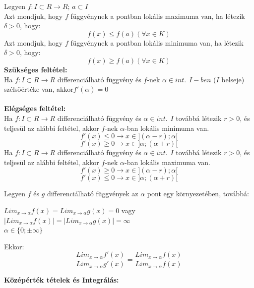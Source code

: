 \documentclass[12pt,a4paper]{article}
\begin{document}
\begin{tcolorbox}[colback=green!5!white,colframe=green!60!black,title= 6. Lokális szélsőérték definíciója és feltétele]
Legyen \(f : I \subset  R \to R\); \(a\subset  I\)\\
    Azt mondjuk, hogy \(f\) függvénynek a pontban lokális maximuma van, ha létezik \(\delta > 0\), hogy:
    $$f(x) \leq  f(a) (\forall  x \in K)$$
    Azt mondjuk, hogy \(f\) függvénynek a pontban lokális minimuma van, ha létezik \(\delta > 0\), hogy:
    $$f(x) \geq  f(a) (\forall  x \in K)$$
    \textbf{Szükséges feltétel:}\\
    Ha \(f : I \subset  R \to R\) differenciálható függvény és \(f\)-nek  \(\alpha \in int.\hspace{5pt}I-ben\) (\(I\) belseje) szélsőértéke van, akkor\(f'(\alpha)=0\)\\\\
    \textbf{Elégséges feltétel:}\\
    Ha \(f : I \subset  R \to R\) differenciálható függvény és \(\alpha \in int. \hspace{5pt}I\) továbbá létezik \(r > 0\), és teljesül az alábbi
feltétel, akkor \(f\)-nek \(\alpha\)-ban lokális minimuma van.\\
$$f'(x) \leq 0 \to x\in](\alpha -r); \alpha[$$
$$f'(x) \geq 0 \to x\in]\alpha; (\alpha + r)[$$
    Ha \(f : I \subset  R \to R\) differenciálható függvény és \(\alpha \in int. \hspace{5pt}I\) továbbá létezik \(r > 0\), és teljesül az alábbi
feltétel, akkor \(f\)-nek \(\alpha\)-ban lokális maximuma van.
$$f'(x) \geq 0 \to x\in](\alpha -r); \alpha[$$
$$f'(x) \leq 0 \to x\in]\alpha; (\alpha + r)[$$

\end{tcolorbox}

\begin{tcolorbox}[colback=green!5!white,colframe=green!60!black,title= 7. L'Hôpital szabály]
    Legyen \(f\) és \(g\) differenciálható függvények az \(\alpha\) pont egy környezetében, továbbá:
    \begin{center}
        \(Lim_{x \to \alpha} f(x)=Lim_{x \to \alpha} g(x)=0\) \hspace{10pt} vagy \hspace{10pt} \(\left\lvert Lim_{x \to \alpha} f(x) \right\rvert = \left\lvert Lim_{x \to \alpha} g(x) \right\rvert = \infty  \)\\
        \(\alpha \in \{0; \pm \infty \}\)
    \end{center}
    Ekkor: 
    $$\frac{Lim_{x \to \alpha} f'(x)}{Lim_{x \to \alpha} g'(x)} = \frac{Lim_{x \to \alpha} f(x)}{Lim_{x \to \alpha} f(x)} $$
\end{tcolorbox}
\newpage
\textbf{Középérték tételek és Integrálás:}
\end{document}
